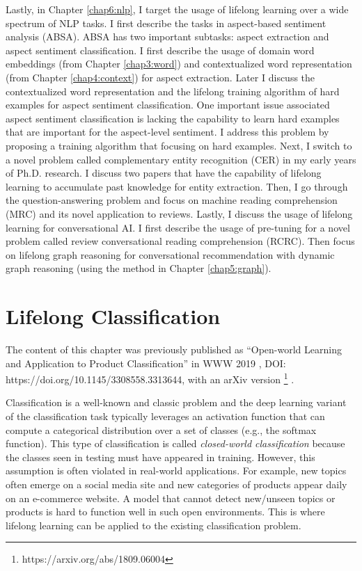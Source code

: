 Lastly, in Chapter \ref{chap6:nlp}, I target the usage of lifelong learning over a wide spectrum of NLP tasks.
I first describe the tasks in aspect-based sentiment analysis (ABSA).
ABSA has two important subtasks: aspect extraction and aspect sentiment classification. 
I first describe the usage of domain word embeddings (from Chapter \ref{chap3:word}) and contextualized word representation (from Chapter \ref{chap4:context}) for aspect extraction.
Later I discuss the contextualized word representation and the lifelong training algorithm of hard examples for aspect sentiment classification.
One important issue associated aspect sentiment classification is lacking the capability to learn hard examples that are important for the aspect-level sentiment.
I address this problem by proposing a training algorithm that focusing on hard examples.
Next, I switch to a novel problem called complementary entity recognition (CER) in my early years of Ph.D. research.
I discuss two papers that have the capability of lifelong learning to accumulate past knowledge for entity extraction.
Then, I go through the question-answering problem and focus on machine reading comprehension (MRC) and its novel application to reviews.
Lastly, I discuss the usage of lifelong learning for conversational AI. 
I first describe the usage of pre-tuning for a novel problem called review conversational reading comprehension (RCRC).
Then focus on lifelong graph reasoning for conversational recommendation with dynamic graph reasoning (using the method in Chapter \ref{chap5:graph}).

\chapter{Lifelong Classification}
\label{chap2:open}

The content of this chapter was previously published as ``Open-world Learning and Application to Product Classification'' in WWW 2019 \cite{xu2019open}, DOI: https://doi.org/10.1145/3308558.3313644, with an arXiv version \footnote{https://arxiv.org/abs/1809.06004} \cite{xu2018open}.

Classification is a well-known and classic problem and the deep learning variant of the classification task typically leverages an activation function that can compute a categorical distribution over a set of classes (e.g., the softmax function).
This type of classification is called \textit{closed-world classification} because the classes seen in testing must have appeared in training. However, this assumption is often violated in real-world applications. For example, new topics often emerge on a social media site and new categories of products appear daily on an e-commerce website. 
A model that cannot detect new/unseen topics or products is hard to function well in such open environments.  
This is where lifelong learning can be applied to the existing classification problem.

